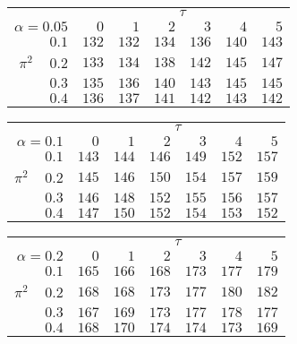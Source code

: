 \begin{tabular}{r|rrrrrr}
\hline\hline
 &\multicolumn{6}{c}{$\tau$} \\ 
 $\alpha = 0.05$ & $0$ & $1$ & $2$ & $3$ & $4$ & $5$ \\ 
 \hline$0.1$ & $132$ & $132$ & $134$ & $136$ & $140$ & $143$\\ 
$\pi^2\;\;\;$ $0.2$ & $133$ & $134$ & $138$ & $142$ & $145$ & $147$\\ 
$0.3$ & $135$ & $136$ & $140$ & $143$ & $145$ & $145$\\ 
$0.4$ & $136$ & $137$ & $141$ & $142$ & $143$ & $142$\\ 
 \hline 
 \end{tabular}
 
 \vspace{2em} 
 
\begin{tabular}{r|rrrrrr}
\hline\hline
 &\multicolumn{6}{c}{$\tau$} \\ 
 $\alpha = 0.1$ & $0$ & $1$ & $2$ & $3$ & $4$ & $5$ \\ 
 \hline$0.1$ & $143$ & $144$ & $146$ & $149$ & $152$ & $157$\\ 
$\pi^2\;\;\;$ $0.2$ & $145$ & $146$ & $150$ & $154$ & $157$ & $159$\\ 
$0.3$ & $146$ & $148$ & $152$ & $155$ & $156$ & $157$\\ 
$0.4$ & $147$ & $150$ & $152$ & $154$ & $153$ & $152$\\ 
 \hline 
 \end{tabular}
 
 \vspace{2em} 
 
\begin{tabular}{r|rrrrrr}
\hline\hline
 &\multicolumn{6}{c}{$\tau$} \\ 
 $\alpha = 0.2$ & $0$ & $1$ & $2$ & $3$ & $4$ & $5$ \\ 
 \hline$0.1$ & $165$ & $166$ & $168$ & $173$ & $177$ & $179$\\ 
$\pi^2\;\;\;$ $0.2$ & $168$ & $168$ & $173$ & $177$ & $180$ & $182$\\ 
$0.3$ & $167$ & $169$ & $173$ & $177$ & $178$ & $177$\\ 
$0.4$ & $168$ & $170$ & $174$ & $174$ & $173$ & $169$\\ 
 \hline 
 \end{tabular}